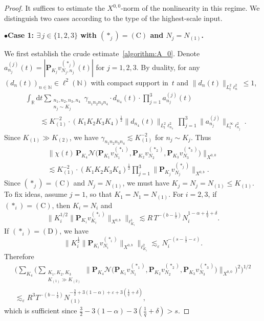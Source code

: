 \documentclass[11pt,reqno,english]{amsart}
\numberwithin{equation}{section}
\theoremstyle{plain}
\theoremstyle{definition}
\theoremstyle{remark}
\renewcommand{\epsilon}{\varepsilon}
\newcommand{\noi}{\noindent}
\newcommand{\R}{\mathbb{R}}
\newcommand{\N}{\mathbb{N}}
\newcommand{\dd}{\mathrm{d}}
\begin{document}
\begin{proof}
	It suffices to estimate the $X^{0,0}$-norm of the nonlinearity in this regime.
	We distinguish two cases according to the type of the highest-scale input.

	\noi
	$\bullet${\bf Case 1: $\exists\, j\in\{1,2,3\}$ with $(\ast_j)=(\mathrm{C})$ and $N_j=N_{(1)}$.}

	We first establish the crude estimate~\eqref{algorithm:A_0}.
	Denote $a_{n_j}^{(j)}(t)=|\mathbf{P}_{K_j}v_{N_j,n_j}^{(\ast_j)}(t)|$ for $j=1,2,3$. By duality, for any $(d_{n}(t))_{n\in \N}\in \ell^2(\N)$ with compact support in~$t$ and $\|d_{n}(t)\|_{L_t^2\ell_n^2}\leq 1$,
	\begin{align*}
		&\int_{\R}\dd t \sum_{\substack{n_1,n_2,n_3,n_4\\
				n_j\sim K_j
		}} \gamma_{n_1 n_2 n_3 n_4}\cdot d_{n_4}(t)\cdot\prod_{j=1}^3 a_{n_j}^{(j)}(t)\\
		&\qquad\lesssim K_{(1)}^{-2}\cdot (K_1 K_2 K_3 K_4)^{\frac{1}{2}} \|d_{n_4}(t)\|_{L_t^2\ell_{n_4}^2}\prod_{j=1}^3\|a_{n_j}^{(j)}\|_{L_t^{\infty}\ell_{n_j}^2}.
	\end{align*}
	Since $K_{(1)}\gg K_{(2)}$, we have $\gamma_{n_1 n_2 n_3 n_4}\lesssim K_{(1)}^{-2}$ for $n_j\sim K_j$.
	Thus
	\begin{multline*}
		\big\|\chi(t)\,\mathbf{P}_{K_4}\mathcal{N}\big(\mathbf{P}_{K_1}v_{N_1}^{(\ast_1)},
		\mathbf{P}_{K_2}v_{N_2}^{(\ast_2)},
		\mathbf{P}_{K_3}v_{N_3}^{(\ast_3)}
		\big)\big\|_{X^{0,0}}
		\\
		\lesssim K_{(1)}^{-2}\cdot (K_1 K_2 K_3 K_4)^{\frac{1}{2}}\prod_{j=1}^3\|\mathbf{P}_{K_j}v_{N_j}^{(\ast_j)}\|_{X^{0,b}}.
	\end{multline*}
	Since $(\ast_j)=(\mathrm{C})$ and $N_j=N_{(1)}$, we must have $K_j=N_j=N_{(1)}\leq K_{(1)}$. To fix ideas, assume $j=1$, so that $K_1=N_1=N_{(1)}$. For $i=2,3$, if $(\ast_i)=(\mathrm{C})$, then $K_i=N_i$ and
	\[
	\big\| K_i^{1/2}\|\mathbf{P}_{K_i}v_{K_i}^{(\ast_i)}\|_{X^{0,b}}\big\|_{\ell_{K_i}^1}\lesssim R\, T^{-(b-\frac{1}{2})}N_i^{1-\alpha+\frac{1}{q}+\delta}.
	\]
	If $(\ast_i)=(\mathrm{D})$, we have
	\[
	\big\|K_i^{\frac{1}{2}}\|\mathbf{P}_{K_i}v_{N_i}^{(\ast_i)}\|_{X^{0,b}}\big\|_{\ell_{K_i}^2}\lesssim_{\epsilon} N_i^{-(s-\frac{1}{2}-\epsilon)}.
	\]
	Therefore
	\begin{multline*}
		\Big(
		\sum_{K_4}
		\Big(
		\sum_{\substack{K_1,K_2,K_3\\
				K_{(1)}\gg K_{(2)}
		}}
		\Big\|
		\mathbf{P}_{K_4}\mathcal{N}
		\big(
		\mathbf{P}_{K_1}v_{N_1}^{(\ast_1)},
		\mathbf{P}_{K_2}v_{N_2}^{(\ast_2)},
		\mathbf{P}_{K_3}v_{N_3}^{(\ast_3)}
		\big)
		\Big\|_{X^{0,0}}
		\Big)^2
		\Big)^{1/2}\\
		\lesssim_{\epsilon}
		R^3 T^{-(b-\frac{1}{2})}
		N_{(1)}^{-\frac{3}{2}+3(1-\alpha)+\epsilon+3(\frac{1}{q}+\delta)},
	\end{multline*}
	which is sufficient since $\frac{3}{2}-3(1-\alpha)-3(\frac{1}{q}+\delta)>s$.


\end{proof}
\end{document}
